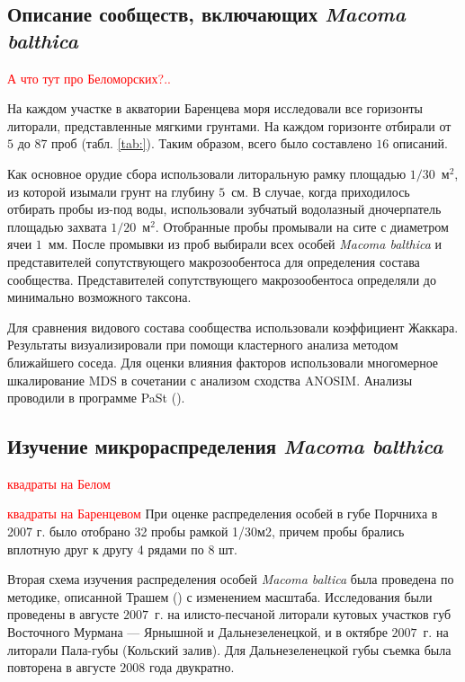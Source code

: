     \subsection{Описание сообществ, включающих {\it Macoma balthica}}
\textcolor{red}{А что тут про Беломорских?..}

На каждом участке в акватории Баренцева моря исследовали все  горизонты литорали, представленные мягкими грунтами.  
На каждом горизонте отбирали от $5$ до $87$ проб  (табл.  \ref{tab:}). Таким образом, всего было составлено $16$ описаний.

Как основное орудие сбора использовали литоральную рамку площадью $1/30$~м$^2$, из которой изымали грунт на глубину $5$~см. 
В случае, когда приходилось отбирать пробы из-под воды, использовали зубчатый водолазный дночерпатель площадью захвата $1/20$~м$^2$.
Отобранные пробы промывали на сите с диаметром ячеи $1$~мм. 
После промывки из   проб   выбирали   всех   особей  {\it Macoma   balthica}  и   представителей   сопутствующего макрозообентоса    для   определения   состава   сообщества.
Представителей   сопутствующего макрозообентоса  определяли   до   минимально   возможного   таксона.

Для сравнения видового состава сообщества использовали коэффициент Жаккара. 
Результаты визуализировали при помощи  кластерного анализа методом ближайшего соседа. 
Для оценки влияния факторов использовали многомерное шкалирование MDS в сочетании с анализом сходства ANOSIM.
Анализы проводили в программе PaSt (\cite{Hammer_et_al_2001}).


	\subsection{Изучение микрораспределения {\it Macoma balthica}}

\textcolor{red}{квадраты на Белом}

\textcolor{red}{квадраты на Баренцевом}
При оценке распределения особей в губе Порчниха в 2007 г. было отобрано 32 пробы рамкой 1/30м2, причем пробы брались вплотную друг к другу 4 рядами по 8 шт.

Вторая схема изучения распределения особей {\it Macoma baltica} была проведена по методике, описанной Трашем (\cite{Thrush_et_al_1989}) с изменением масштаба.
Исследования были проведены в августе $2007$~г. на илисто-песчаной литорали кутовых участков губ Восточного Мурмана --- Ярнышной и Дальнезеленецкой, и в октябре $2007$~г. на литорали Пала-губы (Кольский залив). 
Для Дальнезеленецкой губы съемка была повторена в августе $2008$ года двукратно.

